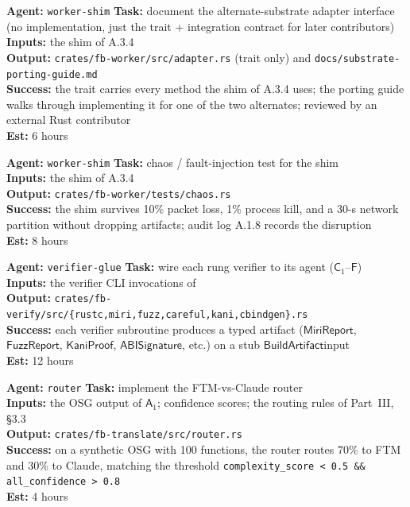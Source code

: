 \documentclass[12pt]{article}
\theoremstyle{definition}
\theoremstyle{remark}
\newcommand{\Agent}[1]{\ensuremath{\mathsf{#1}}}
\newcommand{\Artifact}[1]{\ensuremath{\mathsf{#1}}}
\newcommand{\BArt}{\Artifact{BuildArtifact}}
\newcommand{\MiriR}{\Artifact{MiriReport}}
\newcommand{\FuzzR}{\Artifact{FuzzReport}}
\newcommand{\KaniP}{\Artifact{KaniProof}}
\newcommand{\ABISig}{\Artifact{ABISignature}}
\newenvironment{tasklist}{%
  \begingroup\raggedright
  \begin{description}[style=nextline, leftmargin=1.4cm, itemsep=0.4em]
}{%
  \end{description}
  \endgroup
}
\begin{document}
\begin{tasklist}
\item[\textbf{Task A.3.5}] \textbf{Agent:} \texttt{worker-shim} \quad
  \textbf{Task:} document the alternate-substrate adapter interface
  (no implementation, just the trait + integration contract for
  later contributors)\\
  \textbf{Inputs:} the shim of A.3.4\\
  \textbf{Output:}
  \texttt{crates/fb-worker/src/adapter.rs} (trait only) and
  \texttt{docs/substrate-porting-guide.md}\\
  \textbf{Success:} the trait carries every method the shim of A.3.4
  uses; the porting guide walks through implementing it for one of
  the two alternates; reviewed by an external Rust contributor\\
  \textbf{Est:} 6 hours

\item[\textbf{Task A.3.6}] \textbf{Agent:} \texttt{worker-shim} \quad
  \textbf{Task:} chaos / fault-injection test for the shim\\
  \textbf{Inputs:} the shim of A.3.4\\
  \textbf{Output:} \texttt{crates/fb-worker/tests/chaos.rs}\\
  \textbf{Success:} the shim survives 10\% packet loss, 1\% process
  kill, and a 30-s network partition without dropping artifacts;
  audit log A.1.8 records the disruption\\
  \textbf{Est:} 8 hours

\item[\textbf{Task A.3.7}] \textbf{Agent:} \texttt{verifier-glue} \quad
  \textbf{Task:} wire each rung verifier to its agent
  (\(\Agent{C}_1\)--\(\Agent{F}\))\\
  \textbf{Inputs:} the verifier CLI invocations of
  \\
  \textbf{Output:}
  \texttt{crates/fb-verify/src/\{rustc,miri,fuzz,careful,kani,cbindgen\}.rs}\\
  \textbf{Success:} each verifier subroutine produces a typed
  artifact (\MiriR, \FuzzR, \KaniP, \ABISig, etc.) on a stub
  \BArt input\\
  \textbf{Est:} 12 hours

\item[\textbf{Task A.3.8}] \textbf{Agent:} \texttt{router} \quad
  \textbf{Task:} implement the FTM-vs-Claude router\\
  \textbf{Inputs:} the OSG output of \(\Agent{A}_1\); confidence
  scores; the routing rules of Part~III, \S{}3.3\\
  \textbf{Output:} \texttt{crates/fb-translate/src/router.rs}\\
  \textbf{Success:} on a synthetic OSG with 100 functions, the router
  routes 70\% to FTM and 30\% to Claude, matching the threshold
  \texttt{complexity\_score < 0.5 \&\& all\_confidence > 0.8}\\
  \textbf{Est:} 4 hours


\end{tasklist}
\end{document}
